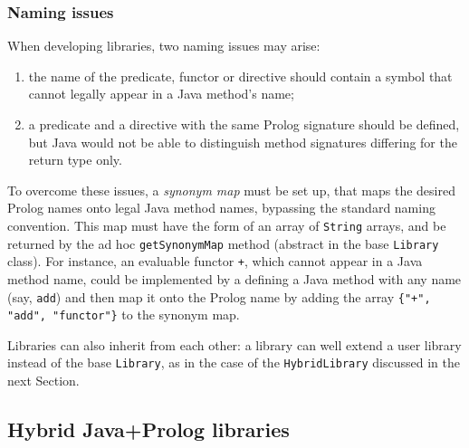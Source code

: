 \subsubsection{Naming issues}

\noindent When developing libraries, two naming issues may arise:
\begin{enumerate}
  \item the name of the predicate, functor or directive should contain a symbol that cannot legally appear in a Java method's name;
  \item a predicate and a directive with the same Prolog signature should be defined, but Java would not be able to distinguish method signatures differing for the return type only.
\end{enumerate}

\noindent To overcome these issues, a \textit{synonym map} must be set up, that maps the desired Prolog names onto legal Java method names, bypassing the standard naming convention.
%
This map must have the form of an array of \texttt{String} arrays, and be returned by the ad hoc \texttt{getSynonymMap} method (abstract in the base \texttt{Library} class).
%
For instance, an evaluable functor \texttt{+}, which cannot appear in a
Java method name, could be implemented by a defining a Java method with any name (say, \texttt{add}) and then map it onto the Prolog name by adding the array \texttt{\{"+", "add", "functor"\}} to the synonym map.

Libraries can also inherit from each other: a library can well extend a user library instead of the base \texttt{Library}, as in the case of the \texttt{HybridLibrary} discussed in the next Section.

\subsection{Hybrid Java+Prolog libraries}
\label{ssec:hybrid-libraries}

